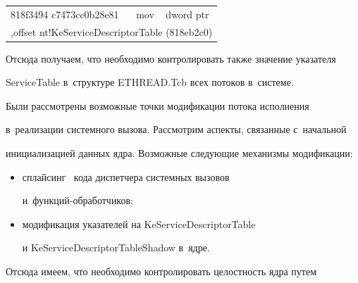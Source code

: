 \begin{table}[h]
\begin{center}
\begin{tabular}{|lll|}
{\sf 818f3494 c7473cc0b28e81}&{\sf     mov} &{\sf    dword ptr} \\


\multicolumn{3}{|l|}{{\sf [edi+3Ch],offset nt!KeServiceDescriptorTable (818eb2c0)}}\\


\hline


\end{tabular}


  \parbox{320pt}{}


\end{center}


 \vspace*{-6pt}


\end{table}





  Отсюда получаем, что необходимо контролировать также значение указателя 


{\sf ServiceTable} в~структуре {\sf ETHREAD.Tcb} всех потоков в~системе.


  


  Были рассмотрены возможные точки модификации потока исполнения 


в~реализации системного вызова. Рассмотрим аспекты, связанные с~начальной 


инициализацией данных ядра. Возможные следующие механизмы модификации:


  \begin{itemize}


\item сплайсинг~\cite{10-g} кода диспетчера системных вызовов 


и~функ\-ций-обра\-бот\-чиков;\\[-15pt]


\item модификация указателей на {\sf KeServiceDescriptorTable}\linebreak 


и \mbox{\sf KeServiceDescriptorTableShadow} в~ядре.


\end{itemize}





   Отсюда имеем, что необходимо контролировать целостность ядра путем 


